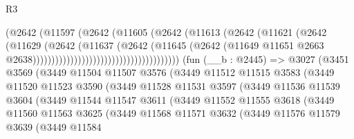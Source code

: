 \begin{lexlean}{R3}
\begin{coremodule}
                                                  (@2642
                                                    (@11597
                                                      (@2642
                                                        (@11605
                                                          (@2642
                                                            (@11613
                                                              (@2642
                                                                (@11621
                                                                  (@2642
                                                                    (@11629
                                                                      (@2642
                                                                        (@11637
                                                                          (@2642
                                                                            (@11645
                                                                              (@2642
                                                                                (@11649
                                                                                  @11651
                                                                                  @2663
                                                                                  @2638)))))))))))))))))))))))))))))))))))))))
    (fun (__b : @2445) =>
    @3027
      (@3451
        @3569
        (@3449
          @11504
          @11507
          @3576
          (@3449
            @11512
            @11515
            @3583
            (@3449
              @11520
              @11523
              @3590
              (@3449
                @11528
                @11531
                @3597
                (@3449
                  @11536
                  @11539
                  @3604
                  (@3449
                    @11544
                    @11547
                    @3611
                    (@3449
                      @11552
                      @11555
                      @3618
                      (@3449
                        @11560
                        @11563
                        @3625
                        (@3449
                          @11568
                          @11571
                          @3632
                          (@3449
                            @11576
                            @11579
                            @3639
                            (@3449
                              @11584

\end{coremodule}
\end{lexlean}
